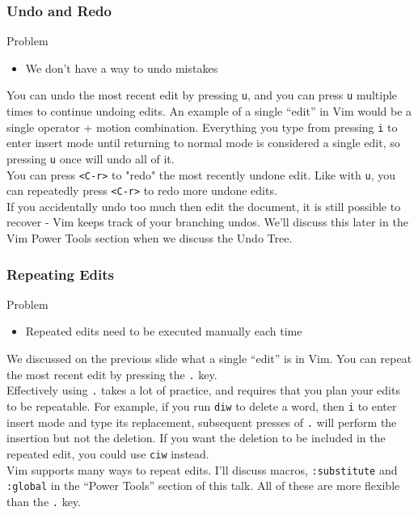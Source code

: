\documentclass{beamer}
\begin{document}
\begin{frame}[fragile]
    \frametitle{Undo and Redo}
    \small
    \begin{block}{Problem}
	\begin{itemize}
	    \item We don't have a way to undo mistakes
	\end{itemize}
    \end{block}
    You can undo the most recent edit by pressing \verb+u+, and you can press \verb+u+ multiple times to continue undoing edits. An example of a single \enquote{edit} in Vim would be a single operator + motion combination. Everything you type from pressing \verb+i+ to enter insert mode until returning to normal mode is considered a single edit, so pressing \verb+u+ once will undo all of it.\\
    \vspace{0.5cm}
    You can press \verb+<C-r>+ to "redo" the most recently undone edit. Like with \verb+u+, you can repeatedly press \verb+<C-r>+ to redo more undone edits.\\
    \vspace{0.5cm}
    If you accidentally undo too much then edit the document, it is still possible to recover - Vim keeps track of your branching undos. We'll discuss this later in the Vim Power Tools section when we discuss the Undo Tree.
\end{frame}

\begin{frame}[fragile]
    \frametitle{Repeating Edits}
    \small
    \begin{block}{Problem}
	\begin{itemize}
	    \item Repeated edits need to be executed manually each time
	\end{itemize}
    \end{block}
    We discussed on the previous slide what a single \enquote{edit} is in Vim. You can repeat the most recent edit by pressing the \verb+.+ key.\\
    \vspace{0.5cm}
    Effectively using \verb+.+ takes a lot of practice, and requires that you plan your edits to be repeatable. For example, if you run \verb+diw+ to delete a word, then \verb+i+ to enter insert mode and type its replacement, subsequent presses of \verb+.+ will perform the insertion but not the deletion. If you want the deletion to be included in the repeated edit, you could use \verb+ciw+ instead.\\
    \vspace{0.5cm}
    Vim supports many ways to repeat edits. I'll discuss macros, \verb+:substitute+ and \verb+:global+ in the \enquote{Power Tools} section of this talk. All of these are more flexible than the \verb+.+ key.
\end{frame}
\end{document}

